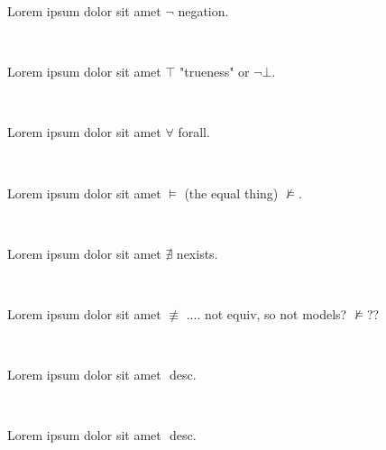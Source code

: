 \documentclass[12pt]{article}
\begin{document}
Lorem ipsum dolor sit amet $ \neg $ negation.

\centerline{~}

Lorem ipsum dolor sit amet $ \top $ "trueness" or $ \neg \bot $.

\centerline{~}

Lorem ipsum dolor sit amet $ \forall $ forall.

\centerline{~}

Lorem ipsum dolor sit amet $ \models $ (the equal thing) $ \nvDash $.

\centerline{~}

Lorem ipsum dolor sit amet $ \nexists $ nexists.

\centerline{~}

Lorem ipsum dolor sit amet $ \not\equiv $ .... not equiv, so not models? $ \not\models $??

\centerline{~}

Lorem ipsum dolor sit amet $  $ desc.

\centerline{~}

Lorem ipsum dolor sit amet $  $ desc.

\centerline{~}
\end{document}
